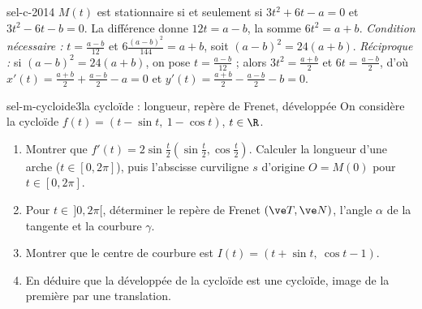 \begin{corrige}{sel-c-2014}
 $M(t)$ est stationnaire si et seulement si $3t^2+6t-a=0$ et $3t^2-6t-b=0$. La différence donne $12t=a-b$, la somme $6t^2=a+b$.
\emph{Condition nécessaire :} $t=\frac{a-b}{12}$ et $6\frac{(a-b)^2}{144}=a+b$, soit $(a-b)^2=24(a+b)$.
\emph{Réciproque :} si $(a-b)^2=24(a+b)$, on pose $t=\frac{a-b}{12}$ ; alors $3t^2=\frac{a+b}2$ et $6t=\frac{a-b}2$, d'où $x'(t)=\frac{a+b}2+\frac{a-b}2-a=0$ et $y'(t)=\frac{a+b}2-\frac{a-b}2-b=0$.
\end{corrige}

\begin{exo}{sel-m-cycloide}{3}{la cycloïde : longueur, repère de Frenet, développée}
On considère la cycloïde $f(t)=(t-\sin t,\ 1-\cos t)$, $t\in\R$.
\begin{enumerate}
\item Montrer que $f'(t)=2\sin\frac t2\left(\sin\frac t2,\cos\frac t2\right)$. Calculer la longueur d'une arche ($t\in[0,2\pi]$), puis l'abscisse curviligne $s$ d'origine $O=M(0)$ pour $t\in[0,2\pi]$.
\item Pour $t\in\,]0,2\pi[$, déterminer le repère de Frenet $(\ve T,\ve N)$, l'angle $\alpha$ de la tangente et la courbure $\gamma$.
\item Montrer que le centre de courbure est $I(t)=(t+\sin t,\ \cos t-1)$.
\item En déduire que la développée de la cycloïde est une cycloïde, image de la première par une translation.
\end{enumerate}
\end{exo}

